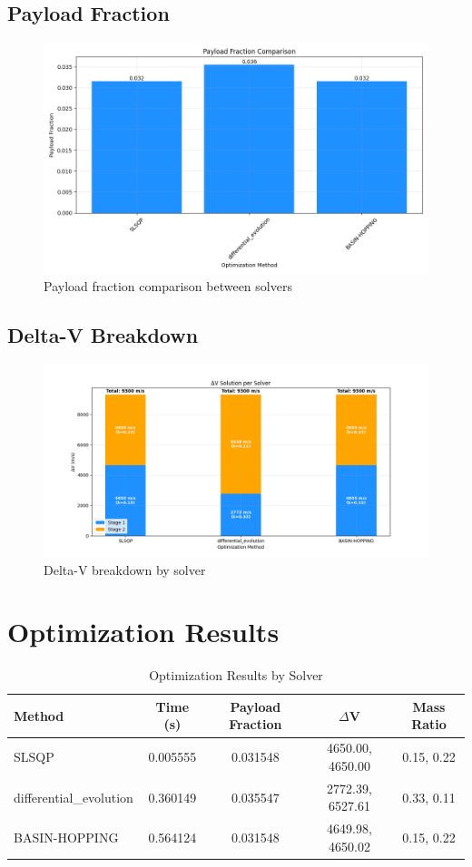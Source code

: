 \documentclass{article}
\begin{document}
\subsection{Payload Fraction}
\begin{figure}[H]
\centering
\includegraphics[width=\textwidth]{payload_fraction.png}
\caption{Payload fraction comparison between solvers}
\end{figure}

\subsection{Delta-V Breakdown}
\begin{figure}[H]
\centering
\includegraphics[width=\textwidth]{dv_breakdown.png}
\caption{Delta-V breakdown by solver}
\end{figure}

\section{Optimization Results}
\begin{table}[H]
\centering
\caption{Optimization Results by Solver}
\small
\begin{tabular}{lcccc}
\toprule
Method & Time (s) & Payload Fraction & $\Delta$V & Mass Ratio \\
\midrule
SLSQP & 0.005555 & 0.031548 & 4650.00, 4650.00 & 0.15, 0.22 \\
differential_evolution & 0.360149 & 0.035547 & 2772.39, 6527.61 & 0.33, 0.11 \\
BASIN-HOPPING & 0.564124 & 0.031548 & 4649.98, 4650.02 & 0.15, 0.22 \\
\bottomrule
\end{tabular}
\end{table}
\end{document}
